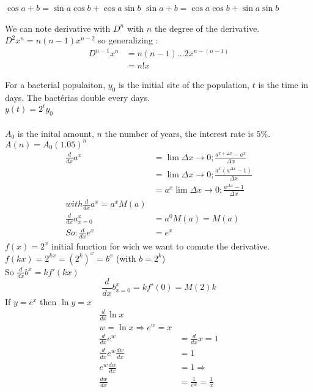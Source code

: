 \documentclass{article}
\begin{document}
    \begin{center}
        $\cos a + b = \sin a \cos b + \cos a \sin b$
        $\sin a+b = \cos a \cos b + \sin a \sin b$
    \end{center}

    We can note derivative with $D^n$ with $n$ the degree of the derivative.\\
    $D^2 x^n = n(n-1)x^{n-2}$ so generalizing :
    \begin{align*}
        D^{n-1} x^n &= n(n-1)...2 x^{n-(n-1)}\\
        &= n! x
    \end{align*}

    For a bacterial populaiton, $y_0$ is the initial site of the population, $t$ is the time in days. The bactérias double every days.\\
    $y(t) = 2^t y_0$\\~\\

    $A_0$ is the inital amount, $n$ the number of years, the interest rate is $5\%$.\\
    $A(n) = A_0 (1.05)^n$\\

    \begin{align*}
        \frac{d}{dx} a^x &= \lim {\Delta x \to 0} ; \frac{a^{x+\Delta x} - a^x}{\Delta x}\\
        &= \lim {\Delta x \to 0} ; \frac{a^x (a^{\Delta x} -1)}{\Delta x}\\
        &= a^x \lim {\Delta x \to 0} ; \frac{a^{\Delta x} -1}{\Delta x}\\
        with \frac{d}{dx} a^x = a^x M(a)\\
        \frac{d}{dx}a^x_{x=0} &= a^0 M(a) = M(a)\\
        So :
        \frac{d}{dx} e^x &= e^x
    \end{align*}
    $f(x) = 2^x$ initial function for wich we want to comute the derivative.\\
    $f(kx) = 2^{kx} = (2^k)^x = b^x$ (with $b=2^k$)\\
    So $\frac{d}{dx}b^x = kf'(kx)$
    \[ \frac{d}{dx}b^x_{x=0} = kf'(0) = M(2)k \]
    If $y=e^x$ then $\ln y = x$\\

    \begin{align*}
        \frac{d}{dx} \ln x\\
        w = \ln x \Rightarrow e^w = x\\
        \frac{d}{dx} e^w &= \frac{d}{dx} x = 1\\
        \frac{d}{dx} e^w \frac{dw}{dx} &= 1\\
        e^w \frac{dw}{dx} &= 1 \Rightarrow \\
        \frac{dw}{dx} &= \frac{1}{e^w} = \frac{1}{x}
    \end{align*}
\end{document}
